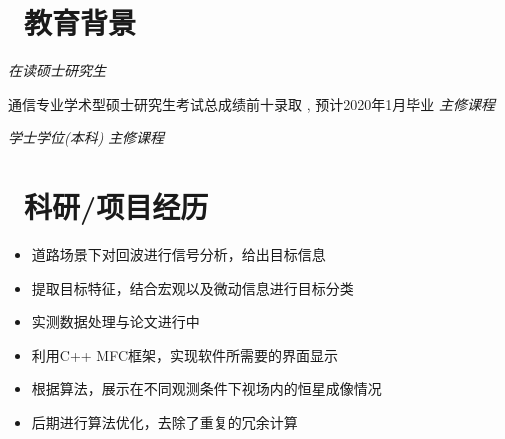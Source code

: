 \documentclass{resume}
\begin{document}


\medskip\noindent
\section{\faGraduationCap\  教育背景}
\textit{在读硕士研究生}
\item{\quad \quad \quad \quad \quad \quad \quad \quad 通信专业学术型硕士研究生考试总成绩前十录取 , 预计2020年1月毕业}\newline
\textit{主修课程}


\textit{学士学位(本科)}\newline
\textit{主修课程}
\section{\faUsers\ 科研/项目经历}

\begin{itemize}[topsep = 0 pt, partopsep = 0pt]
  \item 道路场景下对回波进行信号分析，给出目标信息
  \item 提取目标特征，结合宏观以及微动信息进行目标分类
  \item 实测数据处理与论文进行中
\end{itemize}


\begin{itemize}[topsep = 0 pt, partopsep = 0pt]
  \item 利用C++ MFC框架，实现软件所需要的界面显示
  \item 根据算法，展示在不同观测条件下视场内的恒星成像情况
  \item 后期进行算法优化，去除了重复的冗余计算
\end{itemize}
\end{document}
